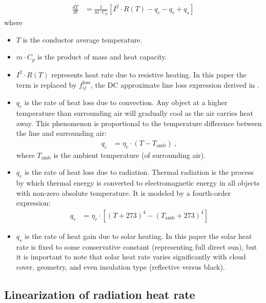 \documentclass[conference]{IEEEtran}
\begin{document}
\begin{align}\label{eq:heatbalance}
\frac{dT}{dt} &= \frac{1}{m\cdot C_p}\left[I^2\cdot R(T) - q_c - q_r + q_s \right]
\end{align}
where
\begin{itemize}
	\item $T$ is the conductor average temperature.
	\item $m\cdot C_p$ is the product of mass and heat capacity.
	\item $I^2\cdot R(T)$ represents heat rate due to resistive heating. In this paper the term is replaced by $f_{ij}^\text{loss}$, the DC approximate line loss expression derived in \cite{almassalkhi2014}.
	\item $q_c$ is the rate of heat loss due to convection. Any object at a higher temperature than surrounding air will gradually cool as the air carries heat away. This phenomenon is proportional to the temperature difference between the line and surrounding air:
		\begin{align}\label{eq:qc}
		q_c &= \eta_c\cdot(T - T_\text{amb})~,
		\end{align}
	where $T_\text{amb}$ is the ambient temperature (of surrounding air).
	\item $q_r$ is the rate of heat loss due to radiation. Thermal radiation is the process by which thermal energy is converted to electromagnetic energy in all objects with non-zero absolute temperature. It is modeled by a fourth-order expression:
	  \begin{align}\label{eq:qr}
	    q_r &= \eta_r\cdot\left[(T + 273)^4 - (T_\text{amb} + 273)^4\right]
	  \end{align}
	\item $q_s$ is the rate of heat gain due to solar heating. In this paper the solar heat rate is fixed to some conservative constant (representing full direct sun), but it is important to note that solar heat rate varies significantly with cloud cover, geometry, and even insulation type (reflective versus black).
\end{itemize}

\subsection{Linearization of radiation heat rate}
\end{document}
